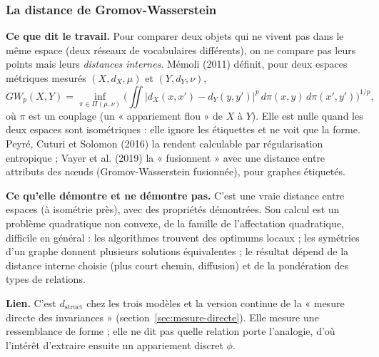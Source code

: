 \documentclass[a4paper,11pt]{article}
\newcommand{\cours}[1]{\par\smallskip\textbf{\textsf{#1}}\enspace}
\begin{document}
\subsubsection{La distance de Gromov-Wasserstein}
\cours{Ce que dit le travail.} Pour comparer deux objets qui ne vivent pas dans le même espace (deux réseaux de vocabulaires différents), on ne compare pas leurs points mais leurs \emph{distances internes}. Mémoli (2011) définit, pour deux espaces métriques mesurés $(X,d_X,\mu)$ et $(Y,d_Y,\nu)$,
\[
GW_p(X,Y)=\inf_{\pi\in\Pi(\mu,\nu)}\Big(\iint |d_X(x,x')-d_Y(y,y')|^p\,d\pi(x,y)\,d\pi(x',y')\Big)^{1/p},
\]
où $\pi$ est un couplage (un « appariement flou » de $X$ à $Y$). Elle est nulle quand les deux espaces sont isométriques : elle ignore les étiquettes et ne voit que la forme. Peyré, Cuturi et Solomon (2016) la rendent calculable par régularisation entropique ; Vayer et al. (2019) la « fusionnent » avec une distance entre attributs des nœuds (Gromov-Wasserstein fusionnée), pour graphes étiquetés.
\cours{Ce qu'elle démontre et ne démontre pas.} C'est une vraie distance entre espaces (à isométrie près), avec des propriétés démontrées. Son calcul est un problème quadratique non convexe, de la famille de l'affectation quadratique, difficile en général : les algorithmes trouvent des optimums locaux ; les symétries d'un graphe donnent plusieurs solutions équivalentes ; le résultat dépend de la distance interne choisie (plus court chemin, diffusion) et de la pondération des types de relations.
\cours{Lien.} C'est $d_{\text{struct}}$ chez les trois modèles et la version continue de la « mesure directe des invariances » (section~\ref{sec:mesure-directe}). Elle mesure une ressemblance de forme ; elle ne dit pas quelle relation porte l'analogie, d'où l'intérêt d'extraire ensuite un appariement discret $\phi$.
\end{document}
